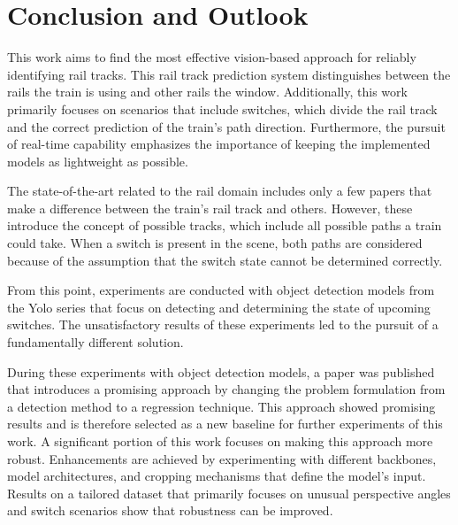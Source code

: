 \clearpage
\chapter{Conclusion and Outlook}
\label{sec:conclusionAndOutlook}

This work aims to find the most effective vision-based approach for reliably identifying rail tracks.
This rail track prediction system distinguishes between the rails the train is using and other rails the window.
Additionally, this work primarily focuses on scenarios that include switches, which divide the rail track and the correct prediction of the train's path direction.
Furthermore, the pursuit of real-time capability emphasizes the importance of keeping the implemented models as lightweight as possible.

The state-of-the-art related to the rail domain includes only a few papers that make a difference between the train's rail track and others.
However, these introduce the concept of possible tracks, which include all possible paths a train could take.
When a switch is present in the scene, both paths are considered because of the assumption that the switch state cannot be determined correctly.

From this point, experiments are conducted with object detection models from the Yolo series that focus on detecting and determining the state of upcoming switches.
The unsatisfactory results of these experiments led to the pursuit of a fundamentally different solution.

During these experiments with object detection models, a paper was published that introduces a promising approach by changing the problem formulation from a detection method to a regression technique.
This approach showed promising results and is therefore selected as a new baseline for further experiments of this work.
A significant portion of this work focuses on making this approach more robust.
Enhancements are achieved by experimenting with different backbones, model architectures, and cropping mechanisms that define the model's input.
Results on a tailored dataset that primarily focuses on unusual perspective angles and switch scenarios show that robustness can be improved.


